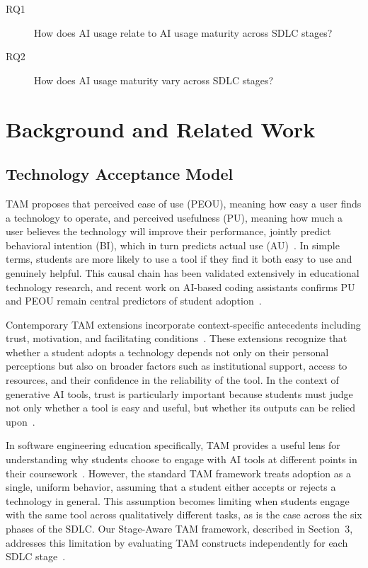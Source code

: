 \documentclass[sigconf,anonymous]{acmart}
\begin{document}
\begin{description}
  \item[RQ1] How does AI usage relate to AI usage maturity across
  SDLC stages?
  \item[RQ2] How does AI usage maturity vary across SDLC stages?
\end{description}

\section{Background and Related Work}
\label{sec:background}

\subsection{Technology Acceptance Model}

TAM proposes that perceived ease of use (PEOU), meaning how easy a 
user finds a technology to operate, and perceived usefulness (PU), 
meaning how much a user believes the technology will improve their 
performance, jointly predict behavioral intention (BI), which in turn 
predicts actual use (AU)~\cite{davis1989a, davis1989b}. In simple terms, 
students are more likely to use a tool if they find it both easy to use 
and genuinely helpful. This causal chain has been validated extensively 
in educational technology research, and recent work on AI-based coding 
assistants confirms PU and PEOU remain central predictors of student 
adoption~\cite{ali2025, gupta2021, simsek2025}.

Contemporary TAM extensions incorporate context-specific antecedents 
including trust, motivation, and facilitating conditions~\cite{ali2025, 
karaoglan2023}. These extensions recognize that whether a student adopts 
a technology depends not only on their personal perceptions but also on 
broader factors such as institutional support, access to resources, and 
their confidence in the reliability of the tool. In the context of 
generative AI tools, trust is particularly important because students 
must judge not only whether a tool is easy and useful, but whether its 
outputs can be relied upon~\cite{ali2025, karaoglan2023}.

In software engineering education specifically, TAM provides a useful 
lens for understanding why students choose to engage with AI tools at 
different points in their coursework~\cite{gupta2021, simsek2025}. 
However, the standard TAM framework treats adoption as a single, uniform 
behavior, assuming that a student either accepts or rejects a technology 
in general. This assumption becomes limiting when students engage with 
the same tool across qualitatively different tasks, as is the case 
across the six phases of the SDLC. Our Stage-Aware TAM framework, 
described in Section~3, addresses this limitation by evaluating TAM 
constructs independently for each SDLC stage~\cite{davis1989a, 
davis1989b}.
\end{document}
